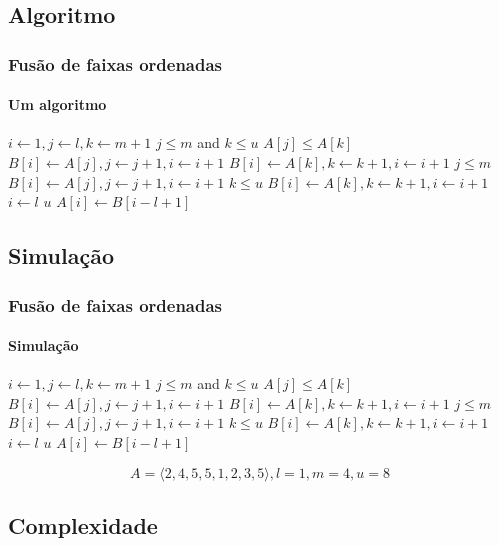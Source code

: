 \documentclass{beamer}
\begin{document}
\subsection{Algoritmo}

\begin{frame}

  \frametitle{Fusão de faixas ordenadas}
  \framesubtitle{Um algoritmo}

\begin{codebox}
\li $i \gets 1, j \gets l, k \gets m+1$
\li \While $j \le m$ and $k \le u$ \Do
\li \If $A[j] \le A[k]$
\li   \Then $B[i] \gets A[j], j \gets j+1, i \gets i+1$
\li   \Else $B[i] \gets A[k], k \gets k+1, i \gets i+1$
      \End
    \End
\li \While $j \le m$
\li \Do $B[i] \gets A[j], j \gets j+1, i \gets i+1$
    \End
\li \While $k \le u$
\li \Do $B[i] \gets A[k], k \gets k+1, i \gets i+1$
    \End
\li \For $i \gets l$ \To $u$
\li \Do $A[i] \gets B[i-l+1]$
    \End
\end{codebox}  

\end{frame}

\subsection{Simulação}

\begin{frame}

  \frametitle{Fusão de faixas ordenadas}
  \framesubtitle{Simulação}

\begin{small}
\begin{codebox}
\li $i \gets 1, j \gets l, k \gets m+1$
\li \While $j \le m$ and $k \le u$ \Do
\li   \If $A[j] \le A[k]$
\li   \Then $B[i] \gets A[j], j \gets j+1, i \gets i+1$
\li   \Else $B[i] \gets A[k], k \gets k+1, i \gets i+1$
      \End
    \End
\li \While $j \le m$
\li \Do $B[i] \gets A[j], j \gets j+1, i \gets i+1$
    \End
\li \While $k \le u$
\li \Do $B[i] \gets A[k], k \gets k+1, i \gets i+1$
    \End
\li \For $i \gets l$ \To $u$
\li \Do $A[i] \gets B[i-l+1]$
    \End
\end{codebox}  
\end{small}

\alert{$$A = \langle 2, 4, 5, 5, 1, 2, 3, 5 \rangle, l = 1, m = 4, u = 8$$}

\end{frame}

\subsection{Complexidade}
\end{document}
